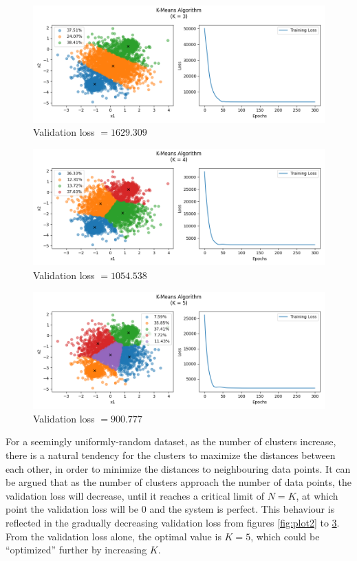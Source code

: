 \documentclass[letterpaper]{article}
\begin{document}
\begin{figure}[H]
	\centering
	\includegraphics[width=\linewidth]{Figure_4}
	\caption{Validation loss $ = 1629.309$}
	\label{fig:plot4}
\end{figure}

\begin{figure}[H]
	\centering
	\includegraphics[width=\linewidth]{Figure_5}
	\caption{Validation loss $ = 1054.538$}
	\label{fig:plot5}
\end{figure}

\begin{figure}[H]
	\centering
	\includegraphics[width=\linewidth]{Figure_6}
	\caption{Validation loss $ = 900.777$}
	\label{fig:plot6}
\end{figure}

\noindent
For a seemingly uniformly-random dataset, as the number of clusters increase, there is a natural tendency for the clusters to maximize the distances between each other, in order to minimize the distances to neighbouring data points. It can be argued that as the number of clusters approach the number of data points, the validation loss will decrease, until it reaches a critical limit of $N = K$, at which point the validation loss will be $0$ and the system is perfect. This behaviour is reflected in the gradually decreasing validation loss from figures \ref{fig:plot2} to \ref{fig:plot6}. From the validation loss alone, the optimal value is $K = 5$, which could be ``optimized'' further by increasing $K$. 
\end{document}
